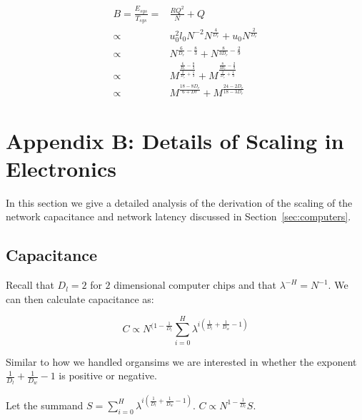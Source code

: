\documentclass[12pt]{article}
\begin{document}
\begin{align*}
B = \frac{E_{sys}}{T_{sys}} =& \frac{RQ^2}{N} + Q \\
 \propto & u_0^2 l_0 N^{-2} N^{\frac{4}{D_r}} + u_0 N^{\frac{2}{D_r}} \\
 \propto & N^{\frac{6}{D_r}- \frac{8}{3}} + N^{\frac{8}{3 D_r} - \frac{2}{9}} \\
 \propto & M^{\frac{\frac{6}{D_r} - \frac{8}{3}}{\frac{2}{D_r} + \frac{1}{3}}}
 + M^{\frac{\frac{8}{3D_r} - \frac{2}{9}}{\frac{2}{D_r} + \frac{1}{3}} } \\
 \propto & M^{\frac{18-8D_r}{6+Dr}} + M^{\frac{24-2D_r}{18-3D_r}} 
\end{align*}

\section{Appendix B: Details of Scaling in Electronics}
\label{sec:AppendixChips}

In this section we give a detailed analysis of the derivation of the scaling of
the network capacitance and network latency discussed in
Section~\ref{sec:computers}.

\subsection{Capacitance}

Recall that $D_l = 2$ for $2$ dimensional computer
chips and that $\lambda^{-H}=N^{-1}$. We can then calculate capacitance as:

\begin{equation}
  C \propto  N^{(1- \frac{1}{D_l}} \sum_{i=0}^H \lambda^{i \left( 
\frac{1}{D_l} + \frac{1}{D_w} -1 \right)}
\end{equation}

Similar to how we handled organsims we are interested in whether the exponent
$\frac{1}{D_l} + \frac{1}{D_w} -1$ is positive or negative.

Let the summand $S = \sum_{i=0}^H \lambda^{i(\frac{1}{D_l} +
\frac{1}{D_w}-1)}$. $C \propto
N^{1-\frac{1}{D_l}} S$. 
\end{document}
